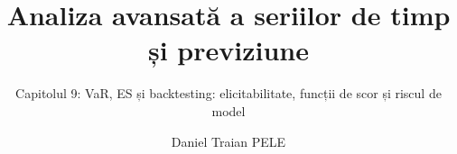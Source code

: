 \title[Analiza avansată a seriilor de timp și previziune]{Analiza avansată a seriilor de timp și previziune}
\subtitle{Capitolul 9: VaR, ES și backtesting: elicitabilitate, funcții de scor și riscul de model}
\author[D.T. Pele]{Daniel Traian PELE}
\date{}

\providecommand{\atsapplink}[3]{\hypertarget{#2}{}\hyperlink{#1}{\beamergotobutton{#3}}}  %
\providecommand{\atsappback}[2]{\begin{tikzpicture}[remember picture,overlay]\node[anchor=south east] at ([xshift=-3mm,yshift=7mm]current page.south east){\hyperlink{#1}{\beamerreturnbutton{#2}}};\end{tikzpicture}}  %
\providecommand{\atschlink}[2]{\href{#1}{#2}}  %
\providecommand{\atschlinkt}[2]{\href{#1}{\usebeamercolor[fg]{frametitle}#2}}  %



